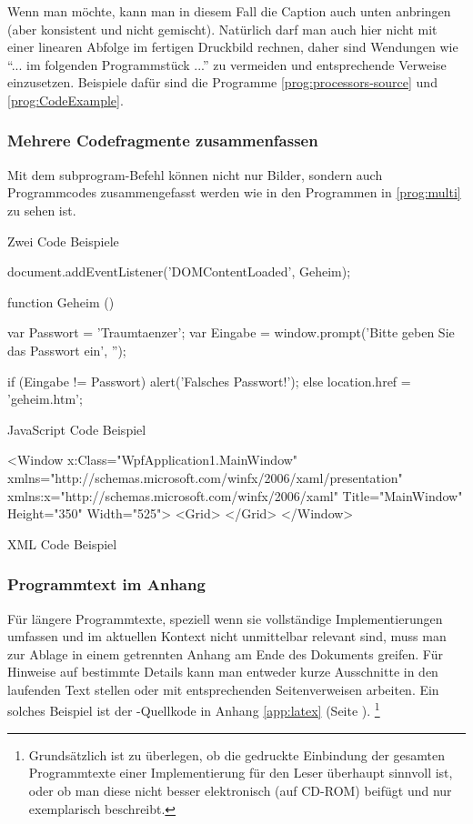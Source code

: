 %
Wenn man möchte, kann man in diesem Fall die Caption auch unten anbringen (aber konsistent und nicht gemischt).
Natürlich darf man auch hier  nicht mit einer linearen  Abfolge im fertigen
Druckbild rechnen, daher sind Wendungen wie
"`... im  folgenden Programmstück ..."' zu vermeiden und entsprechende Verweise
einzusetzen. Beispiele dafür sind die Programme \ref{prog:processors-source} und \ref{prog:CodeExample}.

\subsubsection{Mehrere Codefragmente zusammenfassen}

Mit dem subprogram-Befehl können nicht nur Bilder, sondern auch Programmcodes zusammengefasst werden wie in den Programmen in \ref{prog:multi} zu sehen ist.

\begin{program}
\caption{Zwei Code Beispiele}
	\label{prog:multi}
  \begin{subprogram}[b]{.5\linewidth}
    \begin{JSCode}
  document.addEventListener('DOMContentLoaded', Geheim);

  function Geheim () {
    var Passwort = 'Traumtaenzer';
    var Eingabe = window.prompt('Bitte geben Sie das Passwort ein', '');

    if (Eingabe != Passwort) {
        alert('Falsches Passwort!');
    } else {
        location.href = 'geheim.htm';
    }
  }
\end{JSCode}
    \caption{JavaScript Code Beispiel}
  \end{subprogram}
  \begin{subprogram}[b]{.5\linewidth}
    \begin{XMLCode}
  <Window x:Class="WpfApplication1.MainWindow"
        xmlns="http://schemas.microsoft.com/winfx/2006/xaml/presentation"
        xmlns:x="http://schemas.microsoft.com/winfx/2006/xaml"
        Title="MainWindow" Height="350" Width="525">
  <Grid>
  </Grid>
</Window>
\end{XMLCode}
\caption{XML Code Beispiel}
  \end{subprogram}
  
\end{program}

\subsubsection{Programmtext im Anhang}

Für längere Programmtexte, speziell wenn sie vollständige
Implementierungen umfassen und im aktuellen Kontext nicht
unmittelbar relevant sind, muss man zur Ablage in einem getrennten
Anhang am Ende des Dokuments greifen. Für Hinweise auf bestimmte
Details kann man entweder kurze Ausschnitte in den laufenden Text
stellen oder mit entsprechenden Seitenverweisen arbeiten. Ein
solches Beispiel ist der \latex-Quellkode in Anhang
\ref{app:latex} (Seite \pageref{app:latex}).%
\footnote{%
Grundsätzlich ist zu überlegen, ob die gedruckte Einbindung der gesamten
Programmtexte einer Implementierung für den Leser überhaupt sinnvoll ist, oder
ob man diese nicht besser elektronisch (auf CD-ROM) beifügt und nur exemplarisch
beschreibt.}
